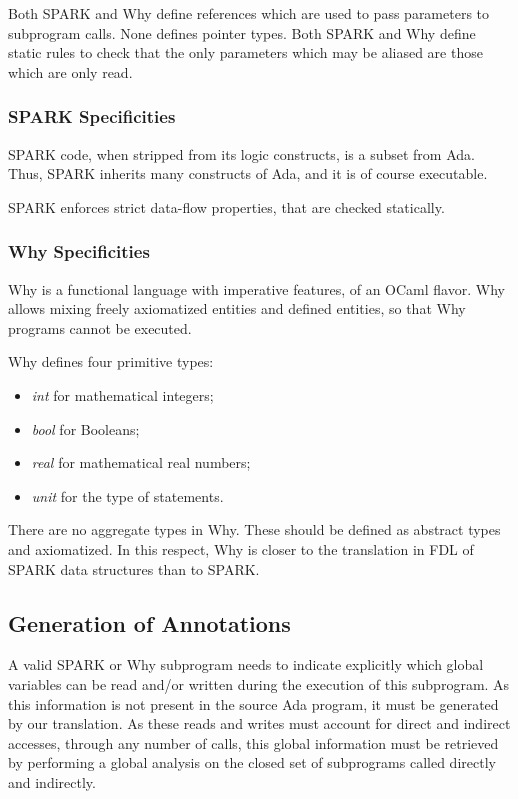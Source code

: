 \documentclass{article}
\begin{document}
Both SPARK and Why define references which are used to pass parameters to
subprogram calls. None defines pointer types. Both SPARK and Why define static
rules to check that the only parameters which may be aliased are those which
are only read.

\subsubsection{SPARK Specificities}

SPARK code, when stripped from its logic constructs, is a subset from
Ada. Thus, SPARK inherits many constructs of Ada, and it is of course
executable.

SPARK enforces strict data-flow properties, that are checked statically.

\subsubsection{Why Specificities}

Why is a functional language with imperative features, of an OCaml flavor. Why
allows mixing freely axiomatized entities and defined entities, so that Why
programs cannot be executed.

Why defines four primitive types:
\begin{itemize}
\item \emph{int} for mathematical integers;
\item \emph{bool} for Booleans;
\item \emph{real} for mathematical real numbers;
\item \emph{unit} for the type of statements.
\end{itemize}

There are no aggregate types in Why. These should be defined as abstract types
and axiomatized. In this respect, Why is closer to the translation in FDL of
SPARK data structures than to SPARK.

\subsection{Generation of Annotations}

A valid SPARK or Why subprogram needs to indicate explicitly which global
variables can be read and/or written during the execution of this
subprogram. As this information is not present in the source Ada program, it
must be generated by our translation. As these reads and writes must account
for direct and indirect accesses, through any number of calls, this global
information must be retrieved by performing a global analysis on the closed set
of subprograms called directly and indirectly.
\end{document}
